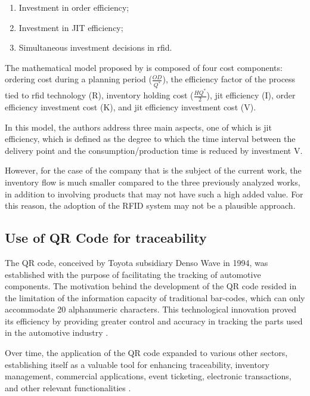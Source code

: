 \begin{enumerate}
  \item Investment in order efficiency;
  \item Investment in JIT efficiency;
  \item Simultaneous investment decisions in \acrfull{rfid}.
\end{enumerate}

The mathematical model proposed by \textcite{Lee2012} is composed of four cost components: ordering cost during a planning period ($\frac{OD}{Q^{*}}$), the efficiency factor of the process tied to \acrshort{rfid} technology (R), inventory holding cost ($ \frac{HQ^*}{2} $), \acrshort{jit} efficiency (I), order efficiency investment cost (K), and \acrshort{jit} efficiency investment cost (V). 

 In this model, the authors address three main aspects, one of which is \acrshort{jit} efficiency, which is defined as the degree to which the time interval between the delivery point and the consumption/production time is reduced by investment V.


However, for the case of the company that is the subject of the current work, the inventory flow is much smaller compared to the three previously analyzed works, in addition to involving products that may not have such a high added value. For this reason, the adoption of the RFID system may not be a plausible approach.

\subsection{Use of QR Code for traceability}\label{QRtraceability}

The QR code, conceived by Toyota subsidiary Denso Wave in 1994, was established with the purpose of facilitating the tracking of automotive components. The motivation behind the development of the QR code resided in the limitation of the information capacity of traditional bar-codes, which can only accommodate 20 alphanumeric characters. This technological innovation proved its efficiency by providing greater control and accuracy in tracking the parts used in the automotive industry \cite{Tiwari2016}.

Over time, the application of the QR code expanded to various other sectors, establishing itself as a valuable tool for enhancing traceability, inventory management, commercial applications, event ticketing, electronic transactions, and other relevant functionalities \cite{Tiwari2016}.

